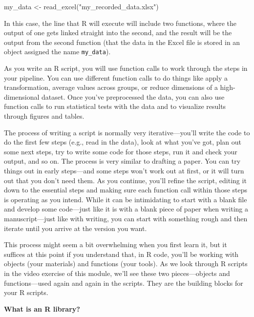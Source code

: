 \documentclass[]{tufte-book}
\newenvironment{Shaded}{}{}
\newcommand{\FunctionTok}[1]{\textcolor[rgb]{0.02,0.16,0.49}{#1}}
\newcommand{\NormalTok}[1]{#1}
\newcommand{\OtherTok}[1]{\textcolor[rgb]{0.00,0.44,0.13}{#1}}
\newcommand{\StringTok}[1]{\textcolor[rgb]{0.25,0.44,0.63}{#1}}
\begin{document}
\begin{Shaded}
\begin{Highlighting}[]
\NormalTok{my\_data }\OtherTok{\textless{}{-}} \FunctionTok{read\_excel}\NormalTok{(}\StringTok{"my\_recorded\_data.xlsx"}\NormalTok{)}
\end{Highlighting}
\end{Shaded}

In this case, the line that R will execute will include two functions, where the
output of one gets linked straight into the second, and the result will be the
output from the second function (that the data in the Excel file is stored in
an object assigned the name \texttt{my\_data}).

As you write an R script, you will use function calls to work through the
steps in your pipeline. You can use different function calls to do things like
apply a transformation, average values across groups, or reduce dimensions of
a high-dimensional dataset. Once you've preprocessed the data, you can also use
function calls to run statistical tests with the data and to visualize results
through figures and tables.

The process of writing a script is normally very iterative---you'll write the
code to do the first few steps (e.g., read in the data), look at what you've
got, plan out some next steps, try to write some code for those steps, run it
and check your output, and so on. The process is very similar to drafting a
paper. You can try things out in early steps---and some steps won't work out at
first, or it will turn out that you don't need them. As you continue, you'll
refine the script, editing it down to the essential steps and making sure each
function call within those steps is operating as you intend. While it can be
intimidating to start with a blank file and develop some code---just like it is
with a blank piece of paper when writing a manuscript---just like with writing,
you can start with something rough and then iterate until you arrive at
the version you want.

This process might seem a bit overwhelming when you first learn it, but it
suffices at this point if you understand that, in R code, you'll be working with
objects (your materials) and functions (your tools). As we look through R
scripts in the video exercise of this module, we'll see these two pieces---objects and
functions---used again and again in the scripts. They are the building blocks
for your R scripts.

\textbf{What is an R library?}
\end{document}
